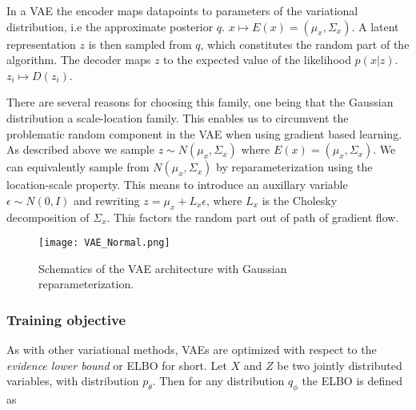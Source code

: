 \documentclass[../../thesis.tex]{subfiles}
\begin{document}
In a VAE the encoder maps datapoints to parameters of the variational distribution, i.e the approximate posterior $q$. $x \mapsto E(x) = (\mu_x, \Sigma_x)$. A latent representation $z$ is then sampled from $q$, which constitutes the random part of the algorithm. The decoder maps $z$ to the expected value of the likelihood $p(x|z)$. $z_i \mapsto D(z_i)$. \newline

There are several reasons for choosing this family, one being that the Gaussian distribution a scale-location family. This enables us to circumvent the problematic random component in the VAE when using gradient based learning. As described above we sample $z\sim N(\mu_x,\Sigma_x)$ where $E(x) = (\mu_x,\Sigma_x)$. We can equivalently sample from $N(\mu_x,\Sigma_x)$ by reparameterization using the location-scale property. This means to introduce an auxillary variable $\epsilon \sim N(0,I)$ and rewriting $z = \mu_x + L_x\epsilon $, where $L_x$ is the Cholesky decomposition of $\Sigma_x$. This factors the random part out of path of gradient flow.
\begin{figure}[h]
    \texttt{[image: VAE\_Normal.png]}
    \centering
    \caption{Schematics of the VAE architecture with Gaussian reparameterization.}
    \label{fig:VAE_Normal}
\end{figure}


\subsubsection{Training objective}

As with other variational methods, VAEs are optimized with respect to the \textit{evidence lower bound} or ELBO for short. Let $X$ and $Z$ be two jointly distributed variables, with distribution $p_\theta$. Then for any distribution $q_\phi$ the ELBO is defined as
\end{document}
